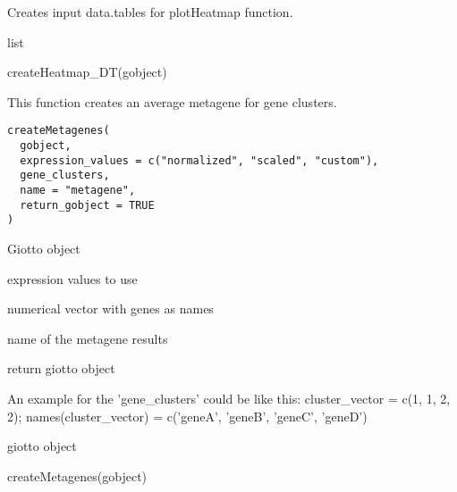 \documentclass[a4paper]{book}
\begin{document}
%
\begin{Details}\relax
Creates input data.tables for plotHeatmap function.
\end{Details}
%
\begin{Value}
list
\end{Value}
%
\begin{Examples}
\begin{ExampleCode}
    createHeatmap_DT(gobject)
\end{ExampleCode}
\end{Examples}
%
\begin{Description}\relax
This function creates an average metagene for gene clusters.
\end{Description}
%
\begin{Usage}
\begin{verbatim}
createMetagenes(
  gobject,
  expression_values = c("normalized", "scaled", "custom"),
  gene_clusters,
  name = "metagene",
  return_gobject = TRUE
)
\end{verbatim}
\end{Usage}
%
\begin{Arguments}
\begin{ldescription}
\item[\code{gobject}] Giotto object

\item[\code{expression\_values}] expression values to use

\item[\code{gene\_clusters}] numerical vector with genes as names

\item[\code{name}] name of the metagene results

\item[\code{return\_gobject}] return giotto object
\end{ldescription}
\end{Arguments}
%
\begin{Details}\relax
An example for the 'gene\_clusters' could be like this:
cluster\_vector = c(1, 1, 2, 2); names(cluster\_vector) = c('geneA', 'geneB', 'geneC', 'geneD')
\end{Details}
%
\begin{Value}
giotto object
\end{Value}
%
\begin{Examples}
\begin{ExampleCode}
    createMetagenes(gobject)
\end{ExampleCode}
\end{Examples}
\end{document}
